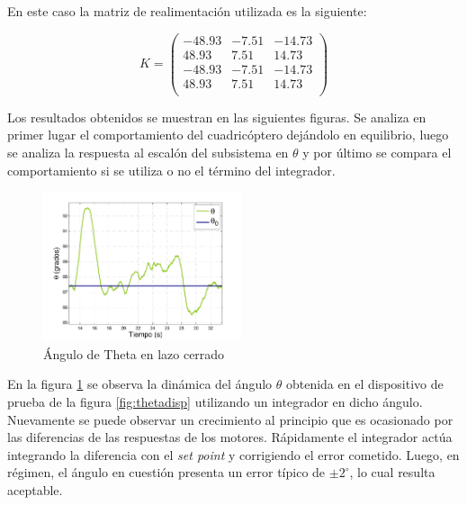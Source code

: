 \documentclass[main]{subfiles}
\begin{document}
En este caso la matriz de realimentación utilizada es la siguiente:

\begin{equation}
\label{K_theta}
K = \left( \begin{array}{ccc}
-48.93 & -7.51 & -14.73\\
 48.93 &  7.51 &  14.73\\
-48.93 & -7.51 & -14.73\\
 48.93 &  7.51 &  14.73\\
\end{array}\right)
\end{equation}
\vspace{10pt}

Los resultados obtenidos se  muestran en las siguientes figuras. Se analiza en primer lugar el comportamiento del cuadricóptero dejándolo en equilibrio, luego se analiza la respuesta al escalón del subsistema en $\theta$ y por último se compara el comportamiento si se utiliza o no el término del integrador.

\begin{figure}
	\vspace{-20pt}
	\centering
	\includegraphics[width=0.52\textwidth]{./pics_test_control/theta.pdf}
	\caption{\'Angulo de Theta en lazo cerrado}
	\label{fig:theta}
\end{figure}

En la figura \ref{fig:theta} se observa la dinámica del ángulo $\theta$ obtenida en el dispositivo de prueba de la figura \ref{fig:thetadisp} utilizando un integrador en dicho ángulo. Nuevamente se puede observar un crecimiento al principio que es ocasionado por las diferencias de las respuestas de los motores. Rápidamente el integrador actúa integrando la diferencia con el \emph{set point} y corrigiendo el error cometido. Luego, en régimen, el ángulo en cuestión presenta un error típico de $\pm 2^\circ$, lo cual resulta aceptable.\\
\end{document}
